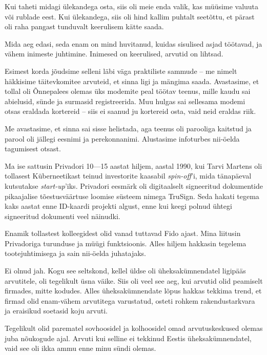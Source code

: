 
Kui taheti midagi ülekandega osta, siis oli meie enda valik, kas 
müüsime valuuta või rublade eest. Kui ülekandega, 
siis oli hind kallim puhtalt seetõttu, et pärast oli raha pangast tunduvalt keerulisem kätte saada.


Mida aeg edasi, seda enam on mind 
huvitanud, kuidas sisulised asjad töötavad, ja vähem 
inimeste juhtimine. Inimesed on keerulised, arvutid on 
lihtsad.


Esimest korda jõudsime selleni läbi väga praktiliste sammude -- me nimelt häkkisime 
täitevkomitee arvuteid, et sinna ligi ja mängima saada. 
Avastasime, et tollal oli Õnnepalees olemas üks modemite peal 
töötav teenus, mille kaudu sai abielusid, sünde ja surmasid registreerida. Muu hulgas sai sellesama 
modemi otsas eraldada kortereid -- siis ei saanud ju kortereid osta, 
vaid neid eraldas riik.


Me avastasime, et sinna sai sisse helistada, aga teenus oli parooliga kaitstud 
ja parool oli jällegi eesnimi ja perekonnanimi. Alustasime infoturbes nii-öelda 
tagumisest otsast.

Ma ise sattusin Privadori 10---15 aastat hiljem, 
aastal 1990, kui Tarvi Martens oli tollasest Küberneetikast teinud 
investorite kaasabil \emph{spin-off}'i, 
mida tänapäeval kutsutakse \emph{start-up}'iks. Privadori eesmärk oli 
digitaalselt signeeritud dokumentide pikaajalise tõestusväärtuse loomise 
süsteem nimega TruSign. Seda hakati tegema kaks aastat enne ID-kaardi 
projekti algust, enne kui keegi polnud ühtegi signeeritud dokumenti veel näinudki.


Enamik tollastest kolleegidest olid vanad tuttavad Fido ajast. Mina liitusin Privadoriga 
turunduse ja müügi funktsioonis. Alles hiljem hakkasin tegelema
tootejuhtimisega ja sain nii-öelda juhatajaks. 


Ei olnud jah. Kogu see seltskond, kellel üldse oli üheksakümnendatel 
ligipääs arvutitele, oli tegelikult üsna väike. Siis oli veel see aeg, kui arvutid olid 
peamiselt firmades, mitte kodudes. Alles üheksakümnendate lõpus hakkas 
tekkima trend, et firmad olid enam-vähem arvutitega varustatud, osteti
rohkem rakendustarkvara ja eraisikud soetasid koju arvuti.

Tegelikult olid parematel sovhoosidel ja kolhoosidel omad 
arvutuskeskused olemas juba nõukogude ajal. Arvuti kui selline ei 
tekkinud Eestis üheksakümnendatel, vaid see oli ikka ammu enne minu sündi 
olemas.
